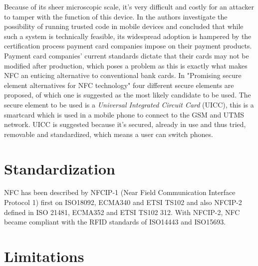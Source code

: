Because of its sheer microscopic scale, it's very difficult and costly for an attacker to tamper with the function of this device.
In \cite{1497411} the authors investigate the possibility of running trusted code in mobile devices and concluded that while such a system is technically feasible, its widespread adoption is hampered by the certification process payment card companies impose on their payment products.
Payment card companies' current standards dictate that their cards may not be modified after production, which poses a problem as this is exactly what makes NFC an enticing alternative to conventional bank cards.
In "Promising secure element alternatives for NFC technology" four different secure elements are proposed, of which one is suggested as the most likely candidate to be used.
The secure element to be used is a \textit{Universal Integrated Circuit Card} (UICC), this is a smartcard which is used in a mobile phone to connect to the GSM and UTMS network. %
UICC is suggested because it's secured, already in use and thus tried, removable and standardized, which means a user can switch phones. 

\section{Standardization}
NFC has been described by NFCIP-1 (Near Field Communication Interface Protocol 1) first on ISO18092, ECMA340 and ETSI TS102 and also NFCIP-2 defined in ISO 21481, ECMA352 and ETSI TS102 312.
With NFCIP-2, NFC became compliant with the RFID standards of ISO14443 and ISO15693.

\section{Limitations}









